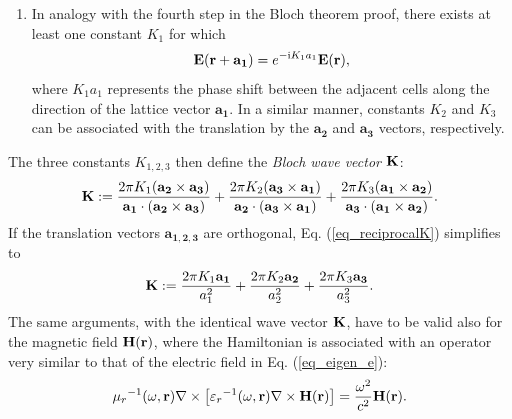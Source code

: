 \begin{enumerate}
{}
\item{In analogy with the fourth step in the Bloch theorem proof, there exists at least one constant $K_1$ for which
\begin{equation}  \mathbf{E}({\mathbf{r}}+\mathbf{a_1}) = e^{-{\mathrm i} K_1 a_1} \mathbf{E}({\mathbf{r}}),  \label{eq_blochtt}\end{equation}
	where $K_1 a_1$ represents the phase shift between the adjacent cells along the direction of the lattice vector $\mathbf{a_1}$. In a similar manner, constants $K_2$ and $K_3$ can be associated with the translation by the $\mathbf{a_2}$ and $\mathbf{a_3}$ vectors, respectively. 
}
 \end{enumerate}
The three constants $K_{1,2,3}$ then define the \textit{Bloch wave vector} ${\mathbf{K}}$: 
\begin{equation} {\mathbf{K}} := 
\frac{2\pi K_1(\mathbf{a_2}\times\mathbf{a_3})}{\mathbf{a_1}\cdot(\mathbf{a_2}\times\mathbf{a_3})} +  
\frac{2\pi K_2(\mathbf{a_3}\times\mathbf{a_1})}{\mathbf{a_2}\cdot(\mathbf{a_3}\times\mathbf{a_1})} +  
\frac{2\pi K_3(\mathbf{a_1}\times\mathbf{a_2})}{\mathbf{a_3}\cdot(\mathbf{a_1}\times\mathbf{a_2})}.
\label{eq_reciprocalK}\end{equation}
If the translation vectors $\mathbf{a_{1,2,3}}$ are orthogonal, Eq. (\ref{eq_reciprocalK}) simplifies to
\begin{equation} {\mathbf{K}} := 
	\frac{2\pi K_1 \mathbf{a_1}}{a_1^{2}} +  
	\frac{2\pi K_2 \mathbf{a_2}}{a_2^{2}} +  
	\frac{2\pi K_3 \mathbf{a_3}}{a_3^{2}}.
\label{eq_reciprocalKorto}\end{equation}
 The same arguments, with the identical wave vector ${\mathbf{K}}$, have to be valid also for the magnetic field $\mathbf{H}({\mathbf{r}})$, where the Hamiltonian is associated with an operator very similar to that of the electric field in Eq. (\ref{eq_eigen_e}):
\begin{equation}
{\mu_r}^{-1 }(\omega,{\mathbf{r}}) \nabla\times \left[{\varepsilon_r}^{-1}(\omega,{\mathbf{r}}) \nabla\times \mathbf{H}({\mathbf{r}})\right] = \frac{\omega^2}{c^2}\mathbf{H}({\mathbf{r}}).   \label{eq_eigen_h}
\end{equation}


